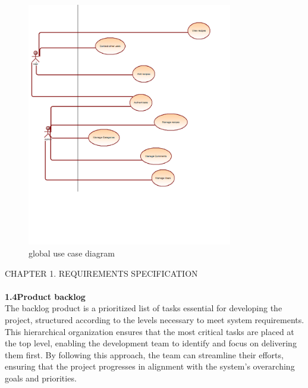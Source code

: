 \documentclass{article}
\begin{document}
\begin{figure}[h]
    \centering
    \includegraphics[width=0.8\textwidth,height=0.9\textheight,keepaspectratio]{use case dia}
    \caption{global use case diagram}
    \label{fig:example}
\end{figure}
\newpage
\noindent
CHAPTER 1.  REQUIREMENTS SPECIFICATION \\
\underline{\hspace{\textwidth}} \vspace{0.2cm}\\
{\Large \textbf{1.4\hspace{1em}Product backlog}}\vspace{0.2cm}
\\The backlog product is a prioritized list of tasks essential for developing the project, structured according to the levels necessary to meet system requirements. This hierarchical organization ensures that the most critical tasks are placed at the top level, enabling the development team to identify and focus on delivering them first. By following this approach, the team can streamline their efforts, ensuring that the project progresses in alignment with the system's overarching goals and priorities.\vspace{0.8cm}
\end{document}
